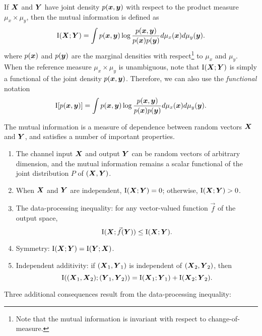 If $\boldsymbol{X}$ and $\boldsymbol{Y}$ have joint density $p(\boldsymbol{x}, \boldsymbol{y})$ with respect to
the product measure $\mu_x \times \mu_y$, then the mutual information
is defined as
\[
\text{I}(\boldsymbol{X};\boldsymbol{Y}) = \int p(\boldsymbol{x}, \boldsymbol{y}) \log \frac{p(\boldsymbol{x}, \boldsymbol{y})}{p(\boldsymbol{x})p(\boldsymbol{y})}d\mu_x(\boldsymbol{x}) d\mu_y(\boldsymbol{y}).
\]
where $p(\boldsymbol{x})$ and $p(\boldsymbol{y})$ are the marginal densities with
respect\footnote{Note that the mutual information is invariant with
  respect to change-of-measure.} to $\mu_x$ and $\mu_y$.  When the
reference measure $\mu_x \times \mu_y$ is unambiguous, note that
$\text{I}(\boldsymbol{X};\boldsymbol{Y})$ is simply a functional of the joint density
$p(\boldsymbol{x}, \boldsymbol{y})$.  Therefore, we can also use the \emph{functional}
notation
\[
\text{I}[p(\boldsymbol{x}, \boldsymbol{y})] = \int p(\boldsymbol{x}, \boldsymbol{y}) \log \frac{p(\boldsymbol{x}, \boldsymbol{y})}{p(\boldsymbol{x})p(\boldsymbol{y})}d\mu_x(\boldsymbol{x}) d\mu_y(\boldsymbol{y}).
\]


The mutual information is a measure of dependence between random
vectors $\boldsymbol{X}$ and $\boldsymbol{Y}$, and satisfies a number of important
properties.
\begin{enumerate}
\item The channel input $\boldsymbol{X}$ and output $\boldsymbol{Y}$ can be random vectors of arbitrary dimension, and the mutual information remains a scalar functional of the joint distribution $P$ of $(\boldsymbol{X}, \boldsymbol{Y})$.
\item When $\boldsymbol{X}$ and $\boldsymbol{Y}$ are independent, $\text{I}(\boldsymbol{X}; \boldsymbol{Y}) = 0$; otherwise, $\text{I}(\boldsymbol{X}; \boldsymbol{Y}) > 0$.
\item The data-processing inequality: for any vector-valued function $\vec{f}$ of the output space,
\[
\text{I}(\boldsymbol{X}; \vec{f}(\boldsymbol{Y})) \leq \text{I}(\boldsymbol{X}; \boldsymbol{Y}).
\]
\item Symmetry: $\text{I}(\boldsymbol{X}; \boldsymbol{Y}) = \text{I}(\boldsymbol{Y}; \boldsymbol{X})$.
\item Independent additivity: if $(\boldsymbol{X}_1,\boldsymbol{Y}_1)$ is independent of $(\boldsymbol{X}_2, \boldsymbol{Y}_2)$, then
\[
\text{I}((\boldsymbol{X}_1,\boldsymbol{X}_2); (\boldsymbol{Y}_1, \boldsymbol{Y}_2)) = \text{I}(\boldsymbol{X}_1; \boldsymbol{Y}_1) + \text{I}(\boldsymbol{X}_2; \boldsymbol{Y}_2).
\]
\end{enumerate}
Three additional consequences result from the data-processing inequality:
